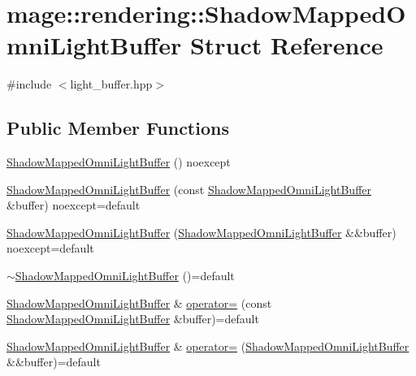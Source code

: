 \hypertarget{structmage_1_1rendering_1_1_shadow_mapped_omni_light_buffer}{}\section{mage\+:\+:rendering\+:\+:Shadow\+Mapped\+Omni\+Light\+Buffer Struct Reference}
\label{structmage_1_1rendering_1_1_shadow_mapped_omni_light_buffer}


{\ttfamily \#include $<$light\+\_\+buffer.\+hpp$>$}

\subsection*{Public Member Functions}
\begin{DoxyCompactItemize}
\item 
\hyperlink{structmage_1_1rendering_1_1_shadow_mapped_omni_light_buffer_a3b9f6ffd582185ea739410aeeec8a446}{Shadow\+Mapped\+Omni\+Light\+Buffer} () noexcept
\item 
\hyperlink{structmage_1_1rendering_1_1_shadow_mapped_omni_light_buffer_a42ed551f04a7c53200e68e45c5ab9be5}{Shadow\+Mapped\+Omni\+Light\+Buffer} (const \hyperlink{structmage_1_1rendering_1_1_shadow_mapped_omni_light_buffer}{Shadow\+Mapped\+Omni\+Light\+Buffer} \&buffer) noexcept=default
\item 
\hyperlink{structmage_1_1rendering_1_1_shadow_mapped_omni_light_buffer_a7fb986d0697bdea8ac54f45c188f2a4b}{Shadow\+Mapped\+Omni\+Light\+Buffer} (\hyperlink{structmage_1_1rendering_1_1_shadow_mapped_omni_light_buffer}{Shadow\+Mapped\+Omni\+Light\+Buffer} \&\&buffer) noexcept=default
\item 
\hyperlink{structmage_1_1rendering_1_1_shadow_mapped_omni_light_buffer_afd9afa7796bbca38082cc8364f7c474c}{$\sim$\+Shadow\+Mapped\+Omni\+Light\+Buffer} ()=default
\item 
\hyperlink{structmage_1_1rendering_1_1_shadow_mapped_omni_light_buffer}{Shadow\+Mapped\+Omni\+Light\+Buffer} \& \hyperlink{structmage_1_1rendering_1_1_shadow_mapped_omni_light_buffer_ae43119f667592aea06f73532a9c9b742}{operator=} (const \hyperlink{structmage_1_1rendering_1_1_shadow_mapped_omni_light_buffer}{Shadow\+Mapped\+Omni\+Light\+Buffer} \&buffer)=default
\item 
\hyperlink{structmage_1_1rendering_1_1_shadow_mapped_omni_light_buffer}{Shadow\+Mapped\+Omni\+Light\+Buffer} \& \hyperlink{structmage_1_1rendering_1_1_shadow_mapped_omni_light_buffer_a5605852385a384c28a4c0cee6bc3cc32}{operator=} (\hyperlink{structmage_1_1rendering_1_1_shadow_mapped_omni_light_buffer}{Shadow\+Mapped\+Omni\+Light\+Buffer} \&\&buffer)=default
\end{DoxyCompactItemize}
